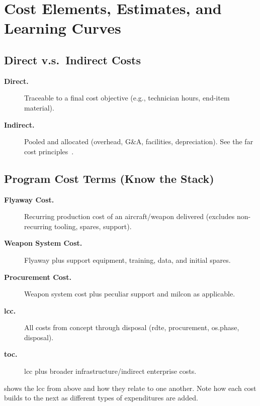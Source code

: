 \documentclass[../main.tex]{subfiles}
\begin{document}

\section{Cost Elements, Estimates, and Learning Curves}
\minibib

\subsection{Direct v.s.\ Indirect Costs}
\begin{description}
	\item[\textbf{Direct.}] Traceable to a final cost objective (e.g., technician hours, end-item material).
	\item[\textbf{Indirect.}] Pooled and allocated (overhead, G\&A, facilities, depreciation). See the \ac{far} cost principles~\autocite{FAR}.
\end{description}

\subsection{Program Cost Terms (Know the Stack)}
\begin{description}
	\item[\textbf{Flyaway Cost.}] Recurring production cost of an aircraft/weapon delivered (excludes non-recurring tooling, spares, support).
	\item[\textbf{Weapon System Cost.}] Flyaway plus support equipment, training, data, and initial spares.
	\item[\textbf{Procurement Cost.}] Weapon system cost plus peculiar support and \ac{milcon} as applicable.
	\item[\textbf{\ac{lcc}.}] All costs from concept through disposal (\ac{rdte}, procurement, \ac{os.phase}, disposal).
	\item[\textbf{\ac{toc}.}] \ac{lcc} plus broader infrastructure/indirect enterprise costs.
\end{description}

\Fig{\ref{fig:lcc_composition}} shows the \ac{lcc} from above and how they relate to one another.  Note how each cost builds to the next as different types of expenditures are added.
\end{document}
